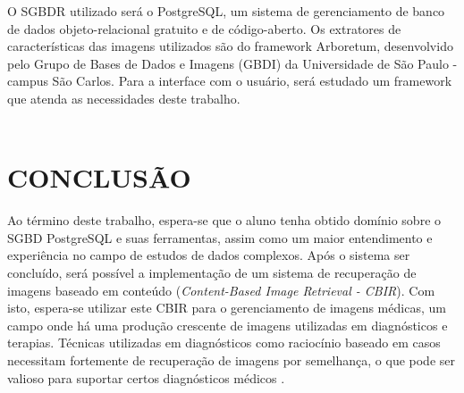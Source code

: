 O SGBDR utilizado será o PostgreSQL, um sistema de gerenciamento de banco de dados objeto-relacional gratuito e de código-aberto. Os extratores de características das imagens utilizados são do framework Arboretum, desenvolvido
pelo Grupo de Bases de Dados e Imagens (GBDI) da Universidade de São Paulo - campus São Carlos. Para a interface com o usuário, será estudado um framework que atenda as necessidades deste trabalho. \\ \\

% 
% 
% 
% 
% 



 
{\let\clearpage\relax \chapter{CONCLUSÃO}} %
\label{chap:conclusao}

Ao término deste trabalho, espera-se que o aluno tenha obtido domínio sobre o SGBD PostgreSQL e suas ferramentas, assim como um maior entendimento e experiência no campo de estudos de dados complexos.
Após o sistema ser concluído, será possível a implementação de um sistema de recuperação de imagens baseado em conteúdo (\textit{Content-Based Image Retrieval - CBIR}). Com isto, espera-se utilizar
este CBIR para o gerenciamento de imagens médicas, um campo onde há uma produção crescente de imagens utilizadas em diagnósticos e terapias. Técnicas utilizadas em diagnósticos como raciocínio baseado
em casos necessitam fortemente de recuperação de imagens por semelhança, o que pode ser valioso para suportar certos diagnósticos médicos \cite{Long2009}. \\ \\


